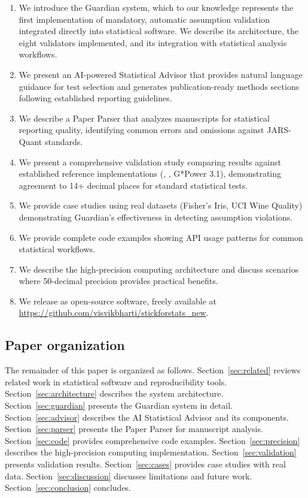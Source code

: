 \documentclass[article]{jss}
\begin{document}
\begin{enumerate}
\item We introduce the Guardian system, which to our knowledge represents the first implementation of mandatory, automatic assumption validation integrated directly into statistical software. We describe its architecture, the eight validators implemented, and its integration with statistical analysis workflows.
\item We present an AI-powered Statistical Advisor that provides natural language guidance for test selection and generates publication-ready methods sections following established reporting guidelines.
\item We describe a Paper Parser that analyzes manuscripts for statistical reporting quality, identifying common errors and omissions against JARS-Quant standards.
\item We present a comprehensive validation study comparing  results against established reference implementations (, , G*Power 3.1), demonstrating agreement to 14+ decimal places for standard statistical tests.
\item We provide case studies using real datasets (Fisher's Iris, UCI Wine Quality) demonstrating Guardian's effectiveness in detecting assumption violations.
\item We provide complete code examples showing API usage patterns for common statistical workflows.
\item We describe the high-precision computing architecture and discuss scenarios where 50-decimal precision provides practical benefits.
\item We release  as open-source software, freely available at \url{https://github.com/visvikbharti/stickforstats_new}.
\end{enumerate}

\subsection{Paper organization}

The remainder of this paper is organized as follows. Section~\ref{sec:related} reviews related work in statistical software and reproducibility tools. Section~\ref{sec:architecture} describes the system architecture. Section~\ref{sec:guardian} presents the Guardian system in detail. Section~\ref{sec:advisor} describes the AI Statistical Advisor and its components. Section~\ref{sec:parser} presents the Paper Parser for manuscript analysis. Section~\ref{sec:code} provides comprehensive code examples. Section~\ref{sec:precision} describes the high-precision computing implementation. Section~\ref{sec:validation} presents validation results. Section~\ref{sec:cases} provides case studies with real data. Section~\ref{sec:discussion} discusses limitations and future work. Section~\ref{sec:conclusion} concludes.
\end{document}
